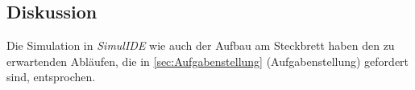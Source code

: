 \documentclass[12pt,english,ngerman]{scrartcl}
\begin{document}
\subsection{Diskussion}
Die Simulation in \textit{SimulIDE} wie auch der Aufbau am Steckbrett
haben den zu erwartenden Abläufen, die in \autoref{sec:Aufgabenstellung} (Aufgabenstellung)
gefordert sind, entsprochen.




\end{document}
